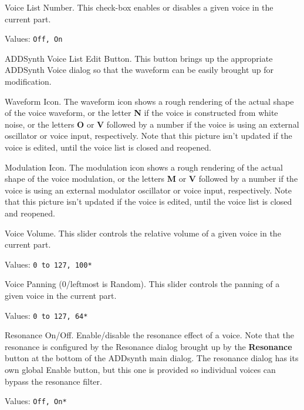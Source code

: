    \setcounter{ItemCounter}{0}      %

   Voice List Number.
   This check-box enables or disables a given voice in the current part.

   Values: \texttt{Off, On}

   ADDSynth Voice List Edit Button.
   This button brings up the appropriate ADDSynth Voice dialog so that the
   waveform can be easily brought up for modification.

   Waveform Icon.
   The waveform icon shows a rough rendering of the actual shape of the voice
   waveform, or the letter \textbf{N} if the voice is constructed from white
   noise, or the letters \textbf{O} or \textbf{V} followed by a number if the
   voice is using an external oscillator or voice input, respectively.
   Note that this picture isn't updated if the voice is edited, until the voice
   list is closed and reopened.

  Modulation Icon.
  The modulation icon shows a rough rendering of the actual shape of the voice
  modulation, or the letters \textbf{M} or \textbf{V} followed by a number if
  the voice is using an external modulator oscillator or voice input,
  respectively.
  Note that this picture isn't updated if the voice is edited, until the voice
  list is closed and reopened.

   Voice Volume.
   This slider controls the relative volume of a given voice in the current
   part.

   Values: \texttt{0 to 127, 100*}

   Voice Panning (0/leftmost is Random).
   This slider controls the panning of a given voice in the current part.

   Values: \texttt{0 to 127, 64*}

   Resonance On/Off.
   Enable/disable the resonance effect of a voice.
   Note that the resonance is configured by the Resonance dialog brought
   up by the \textbf{Resonance} button at the bottom of the ADDsynth main
   dialog.  The resonance dialog has its own global Enable button, but this
   one is provided so individual voices can bypass the resonance filter.

   Values: \texttt{Off, On*}

